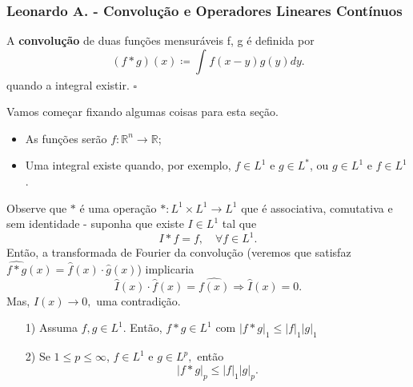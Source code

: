 \documentclass[measure_theory.tex]{subfiles}
\begin{document}
\subsubsection*{Leonardo A. - Convolução e Operadores Lineares Contínuos}
\begin{def*}
	A \textbf{convolução} de duas funções mensuráveis f, g é definida por
	\[
		(f*g)(x)\coloneqq \int_{}^{}f(x-y)g(y)dy.
	\]
	quando a integral existir. \(\square\)
\end{def*}
Vamos começar fixando algumas coisas para esta seção.
\begin{itemize}
	\item As funções serão \(f:\mathbb{R}^{n}\rightarrow \mathbb{R}\);
	\item Uma integral existe quando, por exemplo, \(f\in L^{1} \text{ e } g\in L^{*}\), ou \(g\in L^{1}\text{ e }f\in L^{1}\).
\end{itemize}
Observe que \(*\) é uma operação \(*:L^{1}\times L^{1}\rightarrow L^{1}\) que é associativa, comutativa e sem identidade - suponha que existe \(I\in L^{1}\) tal que
\[
	I*f = f,\quad \forall f\in L^{1}.
\]
Então, a transformada de Fourier da convolução (veremos que satisfaz \(\widehat{f*g}(x) = \hat{f}(x)\cdot \hat{g}(x)\)) implicaria
\[
	\hat{I}(x)\cdot \hat{f}(x) = \hat{f(x)} \Rightarrow \hat{I}(x) = 0.
\]
Mas, \(\hat{I}(x)\to 0,\) uma contradição.
\begin{prop*}
	\begin{itemize}
		\item[1)]Assuma \(f, g\in L^{1}.\) Então,  \(f*g\in L^{1}\) com \(|f*g|_1\leq |f|_1|g|_1\)
		\item[2)] Se \(1\leq p\leq \infty\), \(f\in L^{1}\) e \(g\in L^{p},\) então
		      \[
			      |f*g|_p \leq |f|_1|g|_p.
		      \]
	\end{itemize}
\end{prop*}
\end{document}
